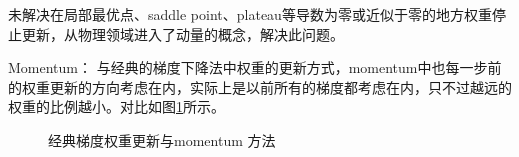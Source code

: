 未解决在局部最优点、saddle point、plateau等导数为零或近似于零的地方权重停止更新，从物理领域进入了动量的概念，解决此问题。

Momentum：
与经典的梯度下降法中权重的更新方式，momentum中也每一步前的权重更新的方向考虑在内，实际上是以前所有的梯度都考虑在内，只不过越远的权重的比例越小。对比如图\ref{fig:gd_vs_monentum}所示。
\begin{figure}[htb]
	\centering
	
	{\quad
	}
	\caption{经典梯度权重更新与momentum 方法}
	\label{fig:gd_vs_monentum}
\end{figure}

